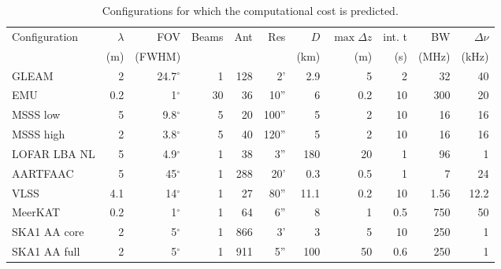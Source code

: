 \documentclass[useAMS,usenatbib]{mn2e}
\newcommand{\degree}{\ensuremath{^{\circ}}\xspace}
\begin{document}
\begin{table}
\caption{Configurations for which the computational cost is predicted.} \label{tbl:computational-cost-configurations}
\begin{tabular}{l|rrrrrrrrrr}
 Configuration&$\lambda$& FOV  & Beams & Ant & Res & $D$ & $\max \Delta z$ & int. t & BW & $\Delta \nu$ \\
          & (m)       & (FWHM)&       &     &     & (km)                       & (m)             & (s)    & (MHz) &  (kHz) \\
\hline
 GLEAM    &  2   & 24.7\degree& 1    & 128 & 2'   & 2.9 & 5 & 2 & 32 & 40 \\
 EMU      & 0.2  & 1\degree   & 30   &  36 & 10''  & 6 & 0.2 &10 & 300 & 20\\
 MSSS low &  5   & 9.8\degree & 5    &  20 & 100'' & 5 & 2  &10 & 16 & 16 \\
 MSSS high&  2   & 3.8\degree & 5    &  40 & 120'' & 5 & 2  &10 & 16 & 16 \\
 LOFAR LBA NL& 5 & 4.9\degree & 1    &  38 &   3'' &180& 20 & 1 & 96 & 1 \\
 AARTFAAC &  5   & 45\degree  & 1    & 288 &  20'  & 0.3& 0.5 & 1 &  7 & 24 \\
 VLSS     & 4.1  & 14\degree  & 1    &  27 &  80'' &11.1& 0.2 &10 & 1.56 & 12.2 \\
 MeerKAT  & 0.2  &  1\degree  & 1    &  64 &   6'' &  8 & 1   & 0.5 & 750  & 50 \\
 SKA1 AA core&2  &  5\degree  & 1    & 866 &    3' &  3& 5 & 10 & 250 & 1 \\
 SKA1 AA full&2  &  5\degree  & 1    & 911 &   5'' &100& 50 & 0.6& 250 & 1 \\
\end{tabular}
\end{table}
\end{document}
